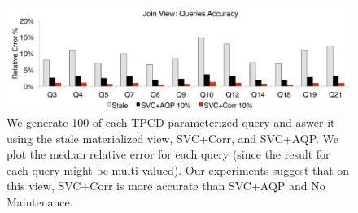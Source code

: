 \begin{figure}[t]
\centering
\includegraphics[scale=0.16]{exp/msj_3.pdf}
 \caption{We generate 100 of each TPCD parameterized query and aswer it using the stale materialized view, SVC+Corr, and SVC+AQP. We plot the median relative error for each query (since the result for each query might be multi-valued). Our experiments suggest that on this view, SVC+Corr is more accurate than SVC+AQP and No Maintenance.\label{exp-1-acc}}
\end{figure}

